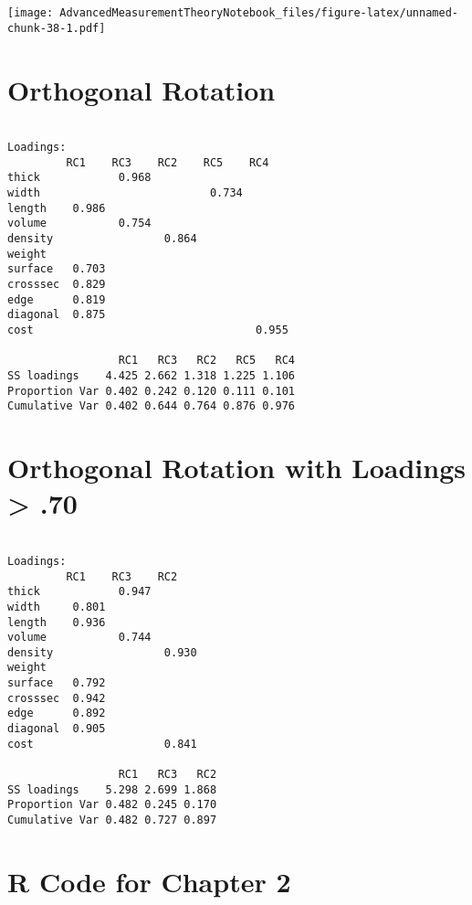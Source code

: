 \documentclass[
]{book}
\begin{document}
\texttt{[image: AdvancedMeasurementTheoryNotebook\_files/figure-latex/unnamed-chunk-38-1.pdf]}

\hypertarget{orthogonal-rotation-1}{%
\section{Orthogonal Rotation}\label{orthogonal-rotation-1}}

\footnotesize

\begin{verbatim}

Loadings:
         RC1    RC3    RC2    RC5    RC4   
thick            0.968                     
width                          0.734       
length    0.986                            
volume           0.754                     
density                 0.864              
weight                                     
surface   0.703                            
crosssec  0.829                            
edge      0.819                            
diagonal  0.875                            
cost                                  0.955

                 RC1   RC3   RC2   RC5   RC4
SS loadings    4.425 2.662 1.318 1.225 1.106
Proportion Var 0.402 0.242 0.120 0.111 0.101
Cumulative Var 0.402 0.644 0.764 0.876 0.976
\end{verbatim}

\hypertarget{orthogonal-rotation-with-loadings-.70}{%
\section{Orthogonal Rotation with Loadings \textgreater{} .70}\label{orthogonal-rotation-with-loadings-.70}}

\footnotesize

\begin{verbatim}

Loadings:
         RC1    RC3    RC2   
thick            0.947       
width     0.801              
length    0.936              
volume           0.744       
density                 0.930
weight                       
surface   0.792              
crosssec  0.942              
edge      0.892              
diagonal  0.905              
cost                    0.841

                 RC1   RC3   RC2
SS loadings    5.298 2.699 1.868
Proportion Var 0.482 0.245 0.170
Cumulative Var 0.482 0.727 0.897
\end{verbatim}

\hypertarget{r-code-for-chapter-2}{%
\section{R Code for Chapter 2}\label{r-code-for-chapter-2}}
\end{document}
